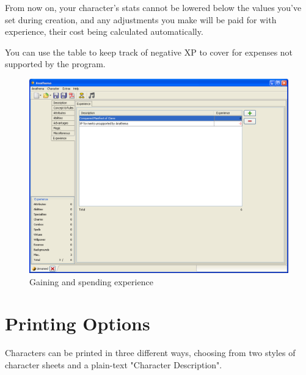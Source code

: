 From now on, your character's stats cannot be lowered below the values you've set during creation, and any adjustments you make will be paid for with experience, their cost being calculated automatically. 

You can use the table to keep track of negative XP to cover for expenses not supported by the program.   

\begin{figure}
	\centering
		\includegraphics[width=1.00\textwidth]{images/Experience.png}
	\caption{Gaining and spending experience}
	\label{fig:Experience}
\end{figure}

\section{Printing Options}
Characters can be printed in three different ways, choosing from two styles of character sheets and a plain-text "Character Description".